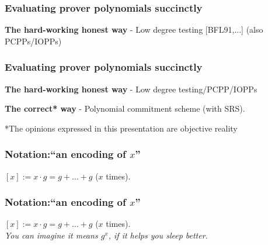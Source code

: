 \documentclass[shadesubsections,trans,14pt,mathserif]{beamer}
\newcommand{\enc}[1]{\ensuremath{\left[#1\right ]}}
\newcommand{\defeq}{\ensuremath{:=}}
\begin{document}
\begin{frame}
  \frametitle{Evaluating prover polynomials succinctly}   %
 
\textbf{The hard-working honest way} - Low degree testing [BFL91,...] \small{(also PCPPs/IOPPs)}

\end{frame}




\begin{frame}
  \frametitle{Evaluating prover polynomials succinctly}   %
 
\textbf{The hard-working honest way} - Low degree testing/PCPP/IOPPs

 \vspace{0.4in}
\textbf{The correct* way} - Polynomial commitment scheme (with SRS).


\vspace{0.8in}
\footnotesize{*The opinions expressed in this presentation are objective reality}
\end{frame}



\begin{frame}
\frametitle{Notation:``an encoding of $x$''}   %
 
$\enc{x}\defeq x\cdot g = g+\ldots+g$ ($x$ times).
 \vspace{0.4in}
 
\end{frame}

\begin{frame}
\frametitle{Notation:``an encoding of $x$''}   %
 
$\enc{x}\defeq x\cdot g = g+\ldots+g$ ($x$ times).\\
 \vspace{1in}
\emph{\small{You can imagine it means $g^x$, if it helps you sleep better.}} 
\end{frame}
\end{document}
